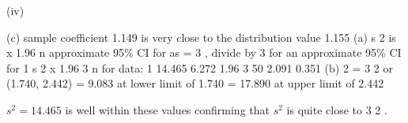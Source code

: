 \documentclass[a4paper,12pt]{article}
\begin{document}
(iv)

(c) sample coefficient 1.149 is very close to the distribution value 1.155
(a) s 2
is x 1.96
n
approximate 95\% CI for
as
= 3 , divide by 3 for an approximate 95\% CI for
1
s 2
x 1.96
3
n
for data:
1
14.465
6.272 1.96
3
50
2.091 0.351
(b)
2
= 3
2
or
(1.740, 2.442)
= 9.083 at lower limit of 1.740
= 17.890 at upper limit of 2.442

$s^2 = 14.465$ is well within these values confirming that $s^2$ is quite close to 3 2 .
\end{document}

